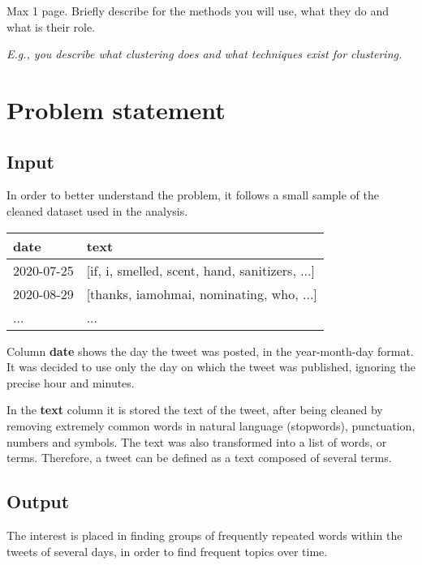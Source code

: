 Max 1 page. Briefly describe for the methods you will use, what they do and what is their role.

\textit{E.g., you describe what clustering does and what techniques exist for clustering.} 


\section{Problem statement}

\subsection*{Input}

In order to better understand the problem, it follows a small sample of the cleaned dataset used in the analysis.

\begin{table}[h]
  \centering
  \begin{tabular}{@{}ll@{}}
  \toprule
  \textbf{date} & \textbf{text}                                      \\ \midrule
  2020-07-25    & {[}if, i, smelled, scent, hand, sanitizers, ...{]} \\
  2020-08-29    & {[}thanks, iamohmai, nominating, who, ...{]}       \\
  ...           & ...                                                \\ \bottomrule
  \end{tabular}
\end{table}

Column \textbf{date} shows the day the tweet was posted, in the year-month-day format. It was decided to use only the day on which the tweet was published, ignoring the precise hour and minutes.

In the \textbf{text} column it is stored the text of the tweet, after being cleaned by removing extremely common words in natural language (stopwords), punctuation, numbers and symbols. The text was also transformed into a list of words, or terms. Therefore, a tweet can be defined as a text composed of several terms.

\subsection*{Output}

The interest is placed in finding groups of frequently repeated words within the tweets of several days, in order to find frequent topics over time.

